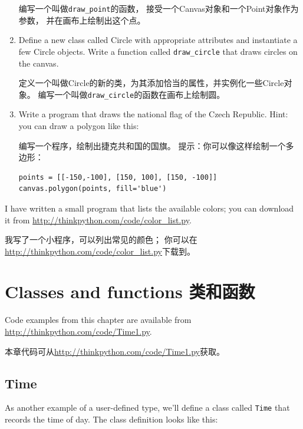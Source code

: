 \documentclass[10pt]{book}
\begin{document}
\begin{CJK}{UTF8}{gbsn}
\begin{exercise}
\begin{enumerate}
  编写一个叫做\verb"draw_point"的函数，
  接受一个Canvas对象和一个Point对象作为参数，
  并在画布上绘制出这个点。

\item Define a new class called Circle with appropriate attributes and
  instantiate a few Circle objects.  Write a function called
  \verb"draw_circle" that draws circles on the canvas.

定义一个叫做Circle的新的类，为其添加恰当的属性，并实例化一些Circle对象。
编写一个叫做\verb"draw_circle"的函数在画布上绘制圆。

\item Write a program that draws the national flag of the Czech Republic.
Hint: you can draw a polygon like this:

编写一个程序，绘制出捷克共和国的国旗。
提示：你可以像这样绘制一个多边形：

\begin{verbatim}
points = [[-150,-100], [150, 100], [150, -100]]
canvas.polygon(points, fill='blue')
\end{verbatim}

\end{enumerate}

I have written a small program that lists the available colors;
you can download it from \url{http://thinkpython.com/code/color_list.py}.

我写了一个小程序，可以列出常见的颜色；
你可以在\url{http://thinkpython.com/code/color_list.py}下载到。

\end{exercise}


\chapter{Classes and functions 类和函数}
\label{time}

Code examples from this chapter are available from
\url{http://thinkpython.com/code/Time1.py}.

本章代码可从\url{http://thinkpython.com/code/Time1.py}获取。

\section{Time}
\label{time.object}

As another example of a user-defined type, we'll define a class called
{\tt Time} that records the time of day.  The class definition looks
like this:


\end{CJK}
\end{document}
